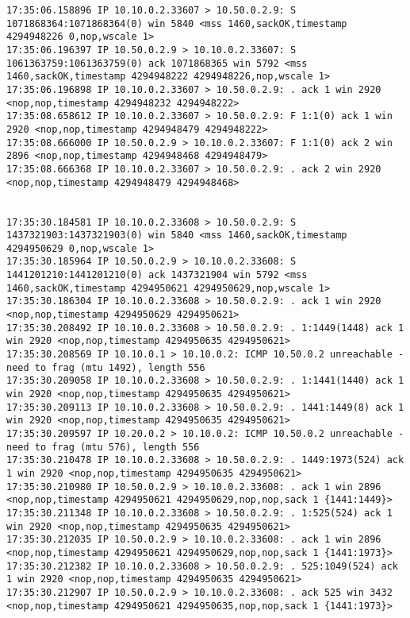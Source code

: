 \documentclass[a4paper,12pt]{article}
\begin{document}
\begin{Verbatim}
17:35:06.158896 IP 10.10.0.2.33607 > 10.50.0.2.9: S 1071868364:1071868364(0) win 5840 <mss 1460,sackOK,timestamp 4294948226 0,nop,wscale 1>
17:35:06.196397 IP 10.50.0.2.9 > 10.10.0.2.33607: S 1061363759:1061363759(0) ack 1071868365 win 5792 <mss 1460,sackOK,timestamp 4294948222 4294948226,nop,wscale 1>
17:35:06.196898 IP 10.10.0.2.33607 > 10.50.0.2.9: . ack 1 win 2920 <nop,nop,timestamp 4294948232 4294948222>
17:35:08.658612 IP 10.10.0.2.33607 > 10.50.0.2.9: F 1:1(0) ack 1 win 2920 <nop,nop,timestamp 4294948479 4294948222>
17:35:08.666000 IP 10.50.0.2.9 > 10.10.0.2.33607: F 1:1(0) ack 2 win 2896 <nop,nop,timestamp 4294948468 4294948479>
17:35:08.666368 IP 10.10.0.2.33607 > 10.50.0.2.9: . ack 2 win 2920 <nop,nop,timestamp 4294948479 4294948468>


17:35:30.184581 IP 10.10.0.2.33608 > 10.50.0.2.9: S 1437321903:1437321903(0) win 5840 <mss 1460,sackOK,timestamp 4294950629 0,nop,wscale 1>
17:35:30.185964 IP 10.50.0.2.9 > 10.10.0.2.33608: S 1441201210:1441201210(0) ack 1437321904 win 5792 <mss 1460,sackOK,timestamp 4294950621 4294950629,nop,wscale 1>
17:35:30.186304 IP 10.10.0.2.33608 > 10.50.0.2.9: . ack 1 win 2920 <nop,nop,timestamp 4294950629 4294950621>
17:35:30.208492 IP 10.10.0.2.33608 > 10.50.0.2.9: . 1:1449(1448) ack 1 win 2920 <nop,nop,timestamp 4294950635 4294950621>
17:35:30.208569 IP 10.10.0.1 > 10.10.0.2: ICMP 10.50.0.2 unreachable - need to frag (mtu 1492), length 556
17:35:30.209058 IP 10.10.0.2.33608 > 10.50.0.2.9: . 1:1441(1440) ack 1 win 2920 <nop,nop,timestamp 4294950635 4294950621>
17:35:30.209113 IP 10.10.0.2.33608 > 10.50.0.2.9: . 1441:1449(8) ack 1 win 2920 <nop,nop,timestamp 4294950635 4294950621>
17:35:30.209597 IP 10.20.0.2 > 10.10.0.2: ICMP 10.50.0.2 unreachable - need to frag (mtu 576), length 556
17:35:30.210478 IP 10.10.0.2.33608 > 10.50.0.2.9: . 1449:1973(524) ack 1 win 2920 <nop,nop,timestamp 4294950635 4294950621>
17:35:30.210980 IP 10.50.0.2.9 > 10.10.0.2.33608: . ack 1 win 2896 <nop,nop,timestamp 4294950621 4294950629,nop,nop,sack 1 {1441:1449}>
17:35:30.211348 IP 10.10.0.2.33608 > 10.50.0.2.9: . 1:525(524) ack 1 win 2920 <nop,nop,timestamp 4294950635 4294950621>
17:35:30.212035 IP 10.50.0.2.9 > 10.10.0.2.33608: . ack 1 win 2896 <nop,nop,timestamp 4294950621 4294950629,nop,nop,sack 1 {1441:1973}>
17:35:30.212382 IP 10.10.0.2.33608 > 10.50.0.2.9: . 525:1049(524) ack 1 win 2920 <nop,nop,timestamp 4294950635 4294950621>
17:35:30.212907 IP 10.50.0.2.9 > 10.10.0.2.33608: . ack 525 win 3432 <nop,nop,timestamp 4294950621 4294950635,nop,nop,sack 1 {1441:1973}>

\end{Verbatim}
\end{document}
